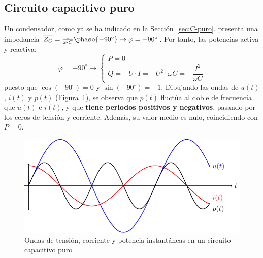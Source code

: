 	\subsection{Circuito capacitivo puro}\label{sec.potencia_C}
	Un condensador, como ya se ha indicado en la
        Sección~\ref{sec:C-puro}, presenta una impedancia
        $\overline{Z_C}=\frac{1}{\omega\cdot
          C}\phase{-90^\circ}\rightarrow \varphi=-90^\circ$. Por tanto,
        las potencias activa y reactiva:
	\begin{equation}
          \varphi = -90^\circ \rightarrow
          \boxed{\begin{cases}
            P = 0\\
            Q = -U\cdot I = -U^2\cdot \omega C = -\dfrac{I^2}{\omega C}
          \end{cases}}
      \end{equation}
      puesto que $\cos(-90^\circ)=0$ y $\sin(-90^\circ)=-1$. Dibujando
      las ondas de $u(t)$, $i(t)$ y $p(t)$
      (Figura~\ref{fig.capacitivoPotencia}), se observa que $p(t)$
      fluctúa al doble de frecuencia que $u(t)$ e $i(t)$, y que
      \textbf{tiene periodos positivos y negativos}, pasando por los
      ceros de tensión y corriente. Además, su valor medio es nulo,
      coincidiendo con $P=0$.
      \begin{figure}[H]
        \centering
        \includegraphics{../figs/capacitivoPuroPotencia.pdf}
        \caption{Ondas de tensión, corriente y potencia instantáneas
          en un circuito capacitivo puro}
        \label{fig.capacitivoPotencia}
      \end{figure}
	
